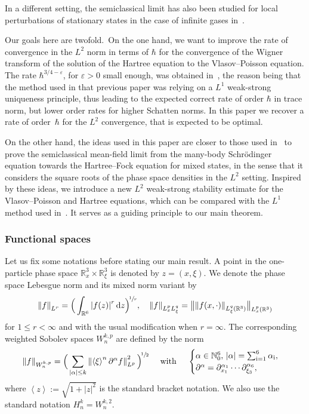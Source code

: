 \documentclass[10pt]{amsart}
\theoremstyle{definition}
\newcommand {\N} {\mathbb N}
\newcommand {\RR} {\mathbb R}
\newcommand {\Rd} {\RR^3}
\newcommand {\RRd} {\RR^6}
\let\lt\left
\let\rt\right
\renewcommand {\(} {\lt(}
\renewcommand {\)} {\rt)}
\newcommand {\bangle}[1] {\lt\langle #1\rt\rangle}
\newcommand {\weight}[1] {\bangle{#1}}
\newcommand {\n}[1] {\lt\lvert #1 \rt\rvert}
\newcommand {\nrm}[1] {\lt\lVert #1\rt\rVert}
\newcommand {\bnrm}[1] {\big\lVert #1\big\rVert}
\newcommand {\Nrm}[2] {\nrm{#1}_{#2}}
\newcommand {\bNrm}[2] {\bnrm{#1}_{#2}}
\let\bd\partial
\let\eps\varepsilon
\renewcommand {\d} {\mathop{}\!\mathrm{d}}
\newcommand {\intdd} {\int_{\RRd}}
\newcommand {\ii} {\mathrm{i}}
\begin{document}
In a different setting, the semiclassical limit has also been studied for local perturbations of stationary states in the case of infinite gases in~\cite{lewin_hartree_2020}.

Our goals here are twofold.~On the one hand, we want to improve the rate of convergence in the $L^2$ norm in terms of $\hbar$ for the convergence of the Wigner transform of the solution of the Hartree equation to the Vlasov--Poisson equation. The rate $\hbar^{3/4-\eps}$, for $\eps>0$ small enough, was obtained in~\cite{lafleche_strong_2021}, the reason being that the method used in that previous paper was relying on a $L^1$ weak-strong uniqueness principle, thus leading to the expected correct rate of order $\hbar$ in trace norm, but lower order rates for higher Schatten norms. In this paper we recover a rate of order~$\hbar$ for the $L^2$ convergence, that is expected to be optimal.

On the other hand, the ideas used in this paper are closer to those used in~\cite{benedikter_mean-field_2016-1, chong_many-body_2021} to prove the semiclassical mean-field limit from the many-body Schrödinger equation towards the Hartree--Fock equation for mixed states, in the sense that it considers the square roots of the phase space densities in the $L^2$ setting. Inspired by these ideas, we introduce a new $L^2$ weak-strong stability estimate for the Vlasov--Poisson and Hartree equations, which can be compared with the $L^1$ method used in~\cite{lafleche_strong_2021}. It serves as a guiding principle to our main theorem.


\subsubsection{Functional spaces} Let us fix some notations before stating our main result. A point in the one-particle phase space $\Rd_x\times \Rd_{\xi}$ is denoted by $z = (x, \xi)$. We denote the phase space Lebesgue norm and its mixed norm variant by
\begin{equation*}
\Nrm{f}{L^r} = \Big(\intdd \n{f(z)}^r\d z\Big)^{\!\sfrac{1}{r}}, \quad \Nrm{f}{L^p_x L^q_{\xi}} = \bNrm{\!\Nrm{f(x, \cdot)}{L^q_{\xi}(\Rd)}\!}{L^p_x(\Rd)}
\end{equation*}
for $1\le r<\infty$ and with the usual modification when $r=\infty$. The corresponding weighted Sobolev spaces $W^{k,p}_n$ are defined by the norm
\begin{equation*}
\Nrm{f}{W^{k,p}_{n}} = \Big(\sum_{\substack{ \n{\alpha} \le k}}\Nrm{\weight{\xi}^n\partial^\alpha f}{L^{p}}^2\Big)^{\!\sfrac{1}{2}}\quad \text{ with }\quad
\begin{cases}
\alpha \in {\N_{0}^6},\, \n{\alpha}= \sum^6_{\ii=1} \alpha_{\ii},
\\
\bd^\alpha = \bd_{x_1}^{\alpha_1}\cdots \bd_{\xi_3}^{\alpha_6},
\end{cases}
\end{equation*}
where $\weight{z}:=\sqrt{1+|z|^2}$ is the standard bracket notation. We also use the standard notation $H^{k}_{n} = W^{k,2}_{n}$.
\end{document}

